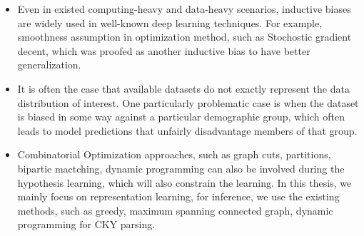 \begin{itemize}
\item {} Even in existed computing-heavy and data-heavy
  scenarios, inductive biases are widely used in well-known deep
  learning techniques. For example, smoothness assumption in
  optimization method, such as Stochostic gradient decent, which was
  proofed as another inductive bias to have better generalization.
   

\item {} It is often the case that available datasets
  do not exactly represent the data distribution of interest.  One
  particularly problematic case is when the dataset is biased in some
  way against a particular demographic group, which often leads to
  model predictions that unfairly disadvantage members of that
  group.





\item {} Combinatorial Optimization approaches,
  such as graph cuts, partitions, bipartie mactching, dynamic
  programming can also be involved during the hypothesis learning,
  which will also constrain the learning.  In this thesis, we mainly
  focus on representation learning, for inference, we use the existing
  methods, such as greedy, maximum spanning connected graph, dynamic
  programming for CKY parsing.

\end{itemize}

